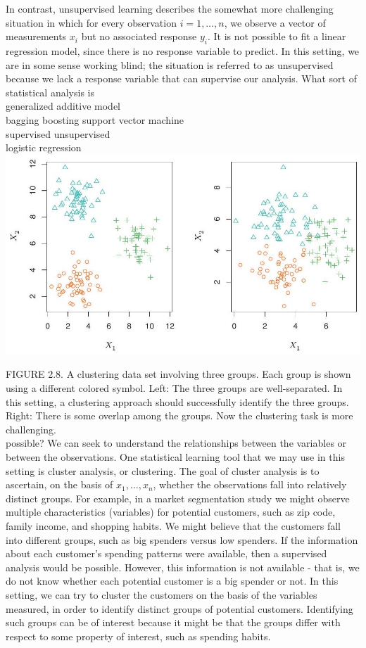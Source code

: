 \documentclass[10pt]{article}
\begin{document}
In contrast, unsupervised learning describes the somewhat more challenging situation in which for every observation $i=1, \ldots, n$, we observe a vector of measurements $x_{i}$ but no associated response $y_{i}$. It is not possible to fit a linear regression model, since there is no response variable to predict. In this setting, we are in some sense working blind; the situation is referred to as unsupervised because we lack a response variable that can supervise our analysis. What sort of statistical analysis is\\
generalized additive model\\
bagging boosting support vector machine\\
supervised unsupervised\\
logistic regression\\
\includegraphics[max width=\textwidth, center]{2025_05_05_efe77898333945044de4g-042}

FIGURE 2.8. A clustering data set involving three groups. Each group is shown using a different colored symbol. Left: The three groups are well-separated. In this setting, a clustering approach should successfully identify the three groups. Right: There is some overlap among the groups. Now the clustering task is more challenging.\\
possible? We can seek to understand the relationships between the variables or between the observations. One statistical learning tool that we may use in this setting is cluster analysis, or clustering. The goal of cluster analysis is to ascertain, on the basis of $x_{1}, \ldots, x_{n}$, whether the observations fall into relatively distinct groups. For example, in a market segmentation study we might observe multiple characteristics (variables) for potential customers, such as zip code, family income, and shopping habits. We might believe that the customers fall into different groups, such as big spenders versus low spenders. If the information about each customer's spending patterns were available, then a supervised analysis would be possible. However, this information is not available - that is, we do not know whether each potential customer is a big spender or not. In this setting, we can try to cluster the customers on the basis of the variables measured, in order to identify distinct groups of potential customers. Identifying such groups can be of interest because it might be that the groups differ with respect to some property of interest, such as spending habits.
\end{document}
